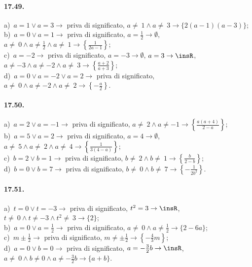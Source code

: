 \paragraph{17.49.}
a)~$a=1\vee a=3 \rightarrow$ priva di significato, $a\neq~1\wedge a\neq~3 \rightarrow \{2(a-1)(a-3)\}$;
\protect\\ b)~$a=0\vee a=1 \rightarrow$ priva di significato, $a=\frac{1}{2} \rightarrow \emptyset$, $a\neq~0\wedge a\neq \frac{1}{2}\wedge a\neq~1 \rightarrow \left\{\frac{1}{2a-1}\right\}$;
\protect\\ c)~$a=-2 \rightarrow$ priva di significato, $a=-3 \rightarrow \emptyset$, $a=3 \rightarrow \insR$, $a\neq -3\wedge a\neq -2\wedge a\neq~3 \rightarrow \left\{\frac{a+2}{a+3}\right\}$;
\protect\\ d)~$a=0\vee a=-2\vee a=2 \rightarrow$ priva di significato, $a\neq~0\wedge a\neq -2\wedge a\neq~2 \rightarrow \left\{-{\frac{a}{2}}\right\}$.

\paragraph{17.50.}
a)~$a=2\vee a=-1 \rightarrow$ priva di significato, $a\neq~2\wedge a\neq -1 \rightarrow \left\{\frac{a(a+4)}{2-a}\right\}$;
\protect\\ b)~$a=5\vee a=2 \rightarrow$ priva di significato, $a=4 \rightarrow \emptyset$, $a\neq~5\wedge a\neq~2\wedge a\neq~4 \rightarrow \left\{\frac{1}{3(4-a)}\right\}$;
\protect\\ c)~$b=2\vee b=1 \rightarrow$ priva di significato, $b\neq~2\wedge b\neq~1 \rightarrow \left\{\frac{b}{2-b}\right\}$;
\protect\\ d)~$b=0\vee b=7\rightarrow$ priva di significato, $b\neq~0\wedge b\neq~7 \rightarrow \left\{-{\frac{1}{2b^{2}}}\right\}$.

\paragraph{17.51.}
a)~$t=0\vee t=-3 \rightarrow$ priva di significato, $t^{2}=3 \rightarrow \insR$, $t\neq~0\wedge t\neq -3\wedge t^{2}\neq~3 \rightarrow \{2\}$;
\protect\\ b)~$a=0\vee a=\frac{1}{2} \rightarrow$ priva di significato, $a\neq~0\wedge a\neq \frac{1}{2} \rightarrow \{2-6a\}$;
\protect\\ c)~$m\pm\frac{1}{2} \rightarrow$ priva di significato, $m\neq \pm\frac{1}{2} \rightarrow \left\{-{\frac{4}{3}}m\right\}$;
\protect\\ d)~$a=0\vee b=0 \rightarrow$ priva di significato, $a=-\frac{3}{2}b\rightarrow \insR$, $a\neq~0\wedge b\neq 0\wedge a\neq-\frac{3}{2}b \rightarrow \{a+b\}$.

